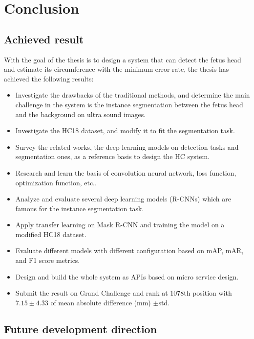 \chapter{Conclusion}
\section{Achieved result}
\noindent
	
	With the goal of the thesis is to design a system that can detect the fetus head and estimate its circumference with the minimum error rate, the thesis has achieved the following results:
	
	\begin{itemize}
		\item Investigate the drawbacks of the traditional methods, and determine the main challenge in the system is the instance segmentation between the fetus head and the background on ultra sound images.
		
		\item Investigate the HC18 dataset, and modify it to fit the segmentation task.
		
		\item Survey the related works, the deep learning models on detection tasks and segmentation ones, as a reference basis to design the HC system.
		
		\item Research and learn the basis of convolution neural network, loss function, optimization function, etc..
		
		\item Analyze and evaluate several deep learning models (R-CNNs) which are famous for the instance segmentation task. 
		
		\item Apply transfer learning on Mask R-CNN and training the model on a modified HC18 dataset.
		
		\item Evaluate different models with different configuration based on mAP, mAR, and F1 score metrics.
		
		\item Design and build the whole system as APIs based on micro service design.
		
		\item Submit the result on Grand Challenge and rank at 1078th position with $7.15 \pm 4.33$ of mean absolute difference (mm) $\pm$std.
	\end{itemize}

\section{Future development direction}
\noindent
	
